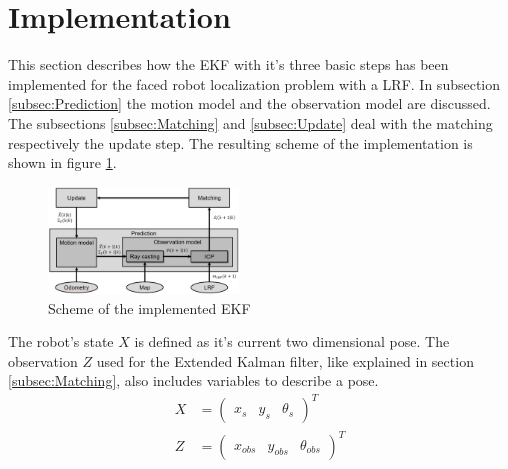 \section{Implementation}
\label{sec:Implementation}


This section describes how the EKF with it's three basic steps has been implemented for the faced robot localization problem with a LRF. In subsection \ref{subsec:Prediction} the motion model and the observation model are discussed. The subsections \ref{subsec:Matching} and \ref{subsec:Update} deal with the matching respectively the update step. The resulting scheme of the implementation is shown in figure \ref{fig:EKF_scheme}. 

\begin{figure}[h]
\centering
\includegraphics[width=0.45\textwidth]{figures/scheme}
      \caption{Scheme of the implemented EKF}
      \label{fig:EKF_scheme}
\end{figure}

The robot's state $X$ is defined as it's current two dimensional pose. The observation $Z$ used for the Extended Kalman filter, like explained in section \ref{subsec:Matching}, also includes variables to describe a pose. 
\begin{align}
X&=\begin{pmatrix}x_s & y_s & \theta_s \end{pmatrix}^T \label{eq:state_def} \\
Z&=\begin{pmatrix}x_{obs} & y_{obs} & \theta_{obs} \end{pmatrix}^T \label{eq:observation_def}
\end{align}

